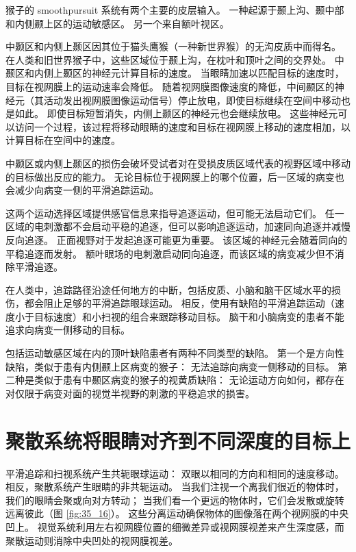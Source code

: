 猴子的 smoothpursuit 系统有两个主要的皮层输入。
一种起源于颞上沟、颞中部和内侧颞上区的运动敏感区。 另一个来自额叶视区。


中颞区和内侧上颞区因其位于猫头鹰猴（一种新世界猴）的无沟皮质中而得名。
在人类和旧世界猴子中，这些区域位于颞上沟，在枕叶和顶叶之间的交界处。
中颞区和内侧上颞区的神经元计算目标的速度。
当眼睛加速以匹配目标的速度时，目标在视网膜上的运动速率会降低。
随着视网膜图像速度的降低，中间颞区的神经元（其活动发出视网膜图像运动信号）停止放电，即使目标继续在空间中移动也是如此。
即使目标短暂消失，内侧上颞区的神经元也会继续放电。
这些神经元可以访问一个过程，该过程将移动眼睛的速度和目标在视网膜上移动的速度相加，以计算目标在空间中的速度。


中颞区或内侧上颞区的损伤会破坏受试者对在受损皮质区域代表的视野区域中移动的目标做出反应的能力。
无论目标位于视网膜上的哪个位置，后一区域的病变也会减少向病变一侧的平滑追踪运动。


这两个运动选择区域提供感官信息来指导追逐运动，但可能无法启动它们。
任一区域的电刺激都不会启动平稳的追逐，但可以影响追逐运动，加速同向追逐并减慢反向追逐。
正面视野对于发起追逐可能更为重要。
该区域的神经元会随着同向的平稳追逐而发射。
额叶眼场的电刺激启动同向追逐，而该区域的病变减少但不消除平滑追逐。


在人类中，追踪路径沿途任何地方的中断，包括皮质、小脑和脑干区域水平的损伤，都会阻止足够的平滑追踪眼球运动。
相反，使用有缺陷的平滑追踪运动（速度小于目标速度）和小扫视的组合来跟踪移动目标。
脑干和小脑病变的患者不能追求向病变一侧移动的目标。


包括运动敏感区域在内的顶叶缺陷患者有两种不同类型的缺陷。
第一个是方向性缺陷，类似于患有内侧颞上区病变的猴子：
无法追踪向病变一侧移动的目标。
第二种是类似于患有中颞区病变的猴子的视黄质缺陷：
无论运动方向如何，都存在对仅限于病变对面的视觉半视野的刺激的平稳追求的损害。



\section{聚散系统将眼睛对齐到不同深度的目标上}

平滑追踪和扫视系统产生共轭眼球运动：
双眼以相同的方向和相同的速度移动。
相反，聚散系统产生眼睛的非共轭运动。
当我们注视一个离我们很近的物体时，我们的眼睛会聚或向对方转动；
当我们看一个更远的物体时，它们会发散或旋转远离彼此（图 \ref{fig:35_16}）。
这些分离运动确保物体的图像落在两个视网膜的中央凹上。
视觉系统利用左右视网膜位置的细微差异或视网膜视差来产生深度感，而聚散运动则消除中央凹处的视网膜视差。


